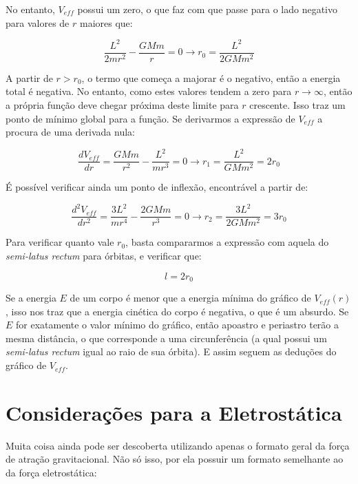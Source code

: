 No entanto, $V_{eff}$ possui um zero, o que faz com que passe para o lado negativo para valores de $r$ maiores que:

\begin{equation}
	\frac{L^2}{2mr^2} - \frac{GMm}{r} = 0 \rightarrow r_0 = \frac{L^2}{2GMm^2}	\label{eq61}
\end{equation} 

A partir de $r > r_0$, o termo que começa a majorar é o negativo, então a energia total é negativa. No entanto, como estes valores tendem a zero para $r \rightarrow \infty$, então a própria função deve chegar próxima deste limite para $r$ crescente. Isso traz um ponto de mínimo global para a função. Se derivarmos a expressão de $V_{eff}$ a procura de uma derivada nula:

\begin{equation}
	\frac{dV_{eff}}{dr} = \frac{GMm}{r^2} -\frac{L^2}{mr^3} = 0 \rightarrow r_1 = \frac{L^2}{GMm^2} = 2r_0	\label{eq62}
\end{equation} 

É possível verificar ainda um ponto de inflexão, encontrável a partir de:

\begin{equation}
	\frac{d^2V_{eff}}{dr^2} = \frac{3L^2}{mr^4} - \frac{2GMm}{r^3}  = 0 \rightarrow r_2 = \frac{3L^2}{2GMm^2} = 3r_0	\label{eq63}
\end{equation}

Para verificar quanto vale $r_0$, basta compararmos a expressão com aquela do \textit{semi-latus rectum} para órbitas, e verificar que:

\begin{equation}
	l = 2r_0	\label{eq64}
\end{equation}

Se a energia $E$ de um corpo é menor que a energia mínima do gráfico de $V_{eff}(r)$, isso nos traz que a energia cinética do corpo é negativa, o que é um absurdo. Se $E$ for exatamente o valor mínimo do gráfico, então apoastro e periastro terão a mesma distância, o que corresponde a uma circunferência (a qual possui um \textit{semi-latus rectum} igual ao raio de sua órbita). E assim seguem as deduções do gráfico de $V_{eff}$.

\section{Considerações para a Eletrostática}

Muita coisa ainda pode ser descoberta utilizando apenas o formato geral da força de atração gravitacional. Não só isso, por ela possuir um formato semelhante ao da força eletrostática:


